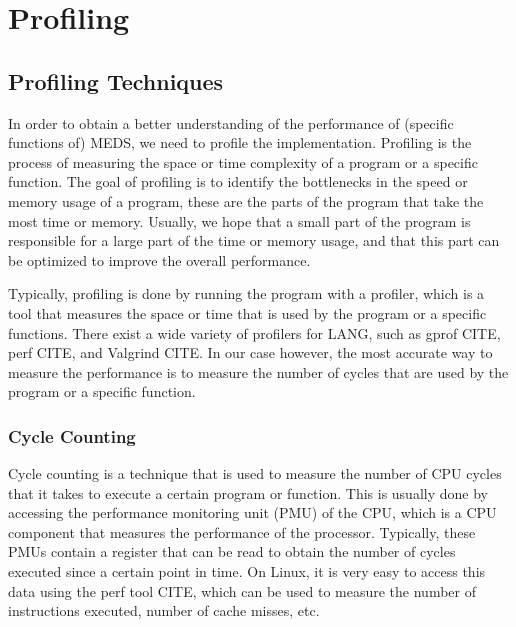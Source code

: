 \documentclass[11pt,a4paper]{report}
\begin{document}
\chapter{Profiling}
\section{Profiling Techniques}
In order to obtain a better understanding of the performance of (specific functions of) MEDS, we need to profile the implementation. Profiling is the process of measuring the space or time complexity of a program or a specific function. The goal of profiling is to identify the bottlenecks in the speed or memory usage of a program, these are the parts of the program that take the most time or memory. Usually, we hope that a small part of the program is responsible for a large part of the time or memory usage, and that this part can be optimized to improve the overall performance.

Typically, profiling is done by running the program with a profiler, which is a tool that measures the space or time that is used by the program or a specific functions. There exist a wide variety of profilers for LANG, such as gprof CITE, perf CITE, and Valgrind CITE. In our case however, the most accurate way to measure the performance is to measure the number of cycles that are used by the program or a specific function.

\subsection{Cycle Counting}
Cycle counting is a technique that is used to measure the number of CPU cycles that it takes to execute a certain program or function. This is usually done by accessing the performance monitoring unit (PMU) of the CPU, which is a CPU component that measures the performance of the processor. Typically, these PMUs contain a register that can be read to obtain the number of cycles executed since a certain point in time. On Linux, it is very easy to access this data using the perf tool CITE, which can be used to measure the number of instructions executed, number of cache misses, etc.
\end{document}

